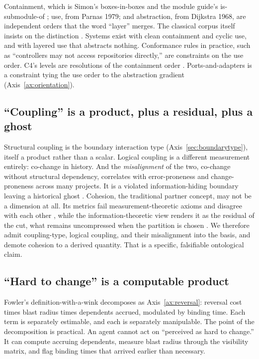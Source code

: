 \documentclass[11pt,oneside]{article}
\theoremstyle{definition}
\begin{document}
Containment, which is Simon's boxes-in-boxes and the module guide's is-submodule-of
\cite{parnas1985}; use, from Parnas 1979; and abstraction, from Dijkstra 1968, are independent
orders that the word ``layer'' merges. The classical corpus itself insists on the distinction
\cite{parnas1972}. Systems exist with clean containment and cyclic use, and with layered use
that abstracts nothing. Conformance rules in practice, such as ``controllers may not access
repositories directly,'' are constraints on the use order. C4's levels are resolutions of the
containment order \cite{c4model}. Ports-and-adapters is a constraint tying the use order to the
abstraction gradient (Axis~\ref{ax:orientation}).

\subsection{``Coupling'' is a product, plus a residual, plus a ghost}

Structural coupling is the boundary interaction type (Axis~\ref{sec:boundarytype}), itself a
product rather than a scalar. Logical coupling is a different measurement entirely: co-change in
history. And the \emph{misalignment} of the two, co-change without structural dependency,
correlates with error-proneness and change-proneness across many projects. It is a violated
information-hiding boundary leaving a historical ghost \cite{mo2016}. Cohesion, the traditional
partner concept, may not be a dimension at all. Its metrics fail measurement-theoretic axioms
and disagree with each other \cite{briand1998}, while the information-theoretic view renders it
as the residual of the cut, what remains uncompressed when the partition is chosen
\cite{allen1999,andritsos2005}. We therefore admit coupling-type, logical coupling, and their
misalignment into the basis, and demote cohesion to a derived quantity. That is a specific,
falsifiable ontological claim.

\subsection{``Hard to change'' is a computable product}

Fowler's definition-with-a-wink \cite{fowler2003} decomposes as Axis~\ref{ax:reversal}:
reversal cost times blast radius times dependents accrued, modulated by binding time. Each term
is separately estimable, and each is separately manipulable. The point of the decomposition is
practical. An agent cannot act on ``perceived as hard to change.'' It can compute accruing
dependents, measure blast radius through the visibility matrix, and flag binding times that
arrived earlier than necessary.
\end{document}
